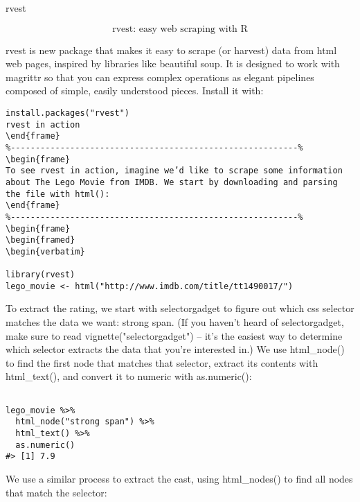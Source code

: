 \begin{frame}
rvest

\[\mbox{rvest: easy web scraping with R}\]

\end{frame}
\begin{frame}

rvest is new package that makes it easy to scrape (or harvest) data from html web pages, inspired by libraries like beautiful soup. It is designed to work with magrittr so that you can express complex operations as elegant pipelines composed of simple, easily understood pieces. Install it with:
\end{frame}
\begin{frame}
\begin{framed}
\begin{verbatim}
install.packages("rvest")
rvest in action
\end{frame}
%----------------------------------------------------------%
\begin{frame}
To see rvest in action, imagine we’d like to scrape some information about The Lego Movie from IMDB. We start by downloading and parsing the file with html():
\end{frame}
%----------------------------------------------------------%
\begin{frame}
\begin{framed}
\begin{verbatim}

library(rvest)
lego_movie <- html("http://www.imdb.com/title/tt1490017/")
\end{verbatim}
\end{framed}
To extract the rating, we start with selectorgadget to figure out which css selector matches the data we want: strong span. (If you haven’t heard of selectorgadget, make sure to read vignette("selectorgadget") – it’s the easiest way to determine which selector extracts the data that you’re interested in.) We use html_node() to find the first node that matches that selector, extract its contents with html_text(), and convert it to numeric with as.numeric():
\end{frame}
\begin{frame}
\begin{framed}
\begin{verbatim}

lego_movie %>% 
  html_node("strong span") %>%
  html_text() %>%
  as.numeric()
#> [1] 7.9
\end{verbatim}
\end{framed}

\end{frame}
\begin{frame}
We use a similar process to extract the cast, using html_nodes() to find all nodes that match the selector:
\end{frame}

